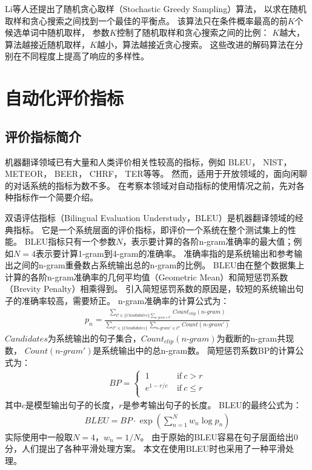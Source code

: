 Li等人还提出了随机贪心取样（Stochastic Greedy Sampling）算法，
以求在随机取样和贪心搜索之间找到一个最佳的平衡点。
该算法只在条件概率最高的前$K$个候选单词中随机取样，
参数$K$控制了随机取样和贪心搜索之间的比例：
$K$越大，算法越接近随机取样，$K$越小，算法越接近贪心搜索。
这些改进的解码算法在分别在不同程度上提高了响应的多样性。

\section{自动化评价指标}\label{sec:automatic_metric}
\subsection{评价指标简介}\label{subsec:metrics_intro}
机器翻译领域已有大量和人类评价相关性较高的指标，例如
BLEU，
NIST，
METEOR，
BEER，
CHRF，
TER等等。
然而，适用于开放领域的，面向闲聊的对话系统的指标为数不多。
在考察本领域对自动指标的使用情况之前，先对各种指标作一个简要介绍。

双语评估指标（Bilingual Evaluation Understudy，BLEU）是机器翻译领域的经典指标。
它是一个系统层面的评价指标，即评价一个系统在整个测试集上的性能。
BLEU指标只有一个参数$N$，表示要计算的各阶n-gram准确率的最大值；例如$N = 4$表示要计算1-gram到4-gram的准确率。
准确率指的是系统输出和参考输出之间的n-gram重叠数占系统输出总的n-gram的比例。
BLEU由在整个数据集上计算的各阶n-gram准确率的几何平均值（Geometric Mean）和简短惩罚系数（Brevity Penalty）相乘得到。
引入简短惩罚系数的原因是，较短的系统输出句子的准确率较高，需要矫正。
n-gram准确率的计算公式为：
\begin{align}
    p_n = \frac{
    \sum_{\mathcal{C} \in \{\textit{Candidates}\}
    \sum_{\textit{n-gram} \in \mathcal{C}}}
    \textit{Count}_{\textit{clip}}(\textit{n-gram})
    }{
    \sum_{\mathcal{C'} \in \{\textit{Candidates}\}}
    \sum_{\textit{n-gram}' \in \mathcal{C'}}
    \textit{Count}(\textit{n-gram}')
    }
\end{align}
$\textit{Candidates}$为系统输出的句子集合，$\textit{Count}_{\textit{clip}}(\textit{n-gram})$为截断的n-gram共现数，
$\textit{Count}(\textit{n-gram}')$是系统输出中的总n-gram数。
简短惩罚系数BP的计算公式为：
\begin{align}
    \textit{BP} =
    \begin{cases}
        \ 1 \ & \text{if} \  c > r \\
        \ e^{1 - r/c} \ & \text{if} \  c \leq r \\
    \end{cases}
\end{align}
其中$c$是模型输出句子的长度，$r$是参考输出句子的长度。
BLEU的最终公式为：
\begin{align}
    \textit{BLEU} = \textit{BP} \cdot \exp \left( \sum_{n=1}^N w_n \log p_n \right)
\end{align}
实际使用中一般取$N = 4$，$w_n = 1 / N$。
由于原始的BLEU容易在句子层面给出0分，人们提出了各种平滑处理方案。
本文在使用BLEU时也采用了一种平滑处理。

